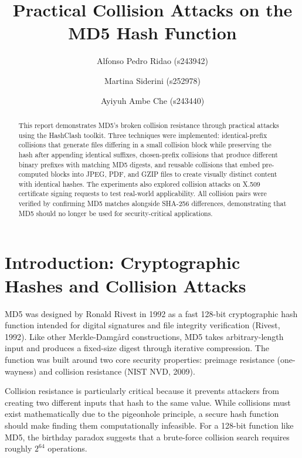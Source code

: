 \documentclass[runningheads]{llncs}
\begin{document}
    \title{Practical Collision Attacks on the MD5 Hash Function}
    \author{Alfonso Pedro Ridao (s243942) \and Martina Siderini (s252978) \and Ayiyuh Ambe Che (s243440)}

    \maketitle

    \begin{abstract}
        This report demonstrates MD5's broken collision resistance through practical attacks using the HashClash toolkit. Three techniques were implemented: identical-prefix collisions that generate files differing in a small collision block while preserving the hash after appending identical suffixes, chosen-prefix collisions that produce different binary prefixes with matching MD5 digests, and reusable collisions that embed pre-computed blocks into JPEG, PDF, and GZIP files to create visually distinct content with identical hashes. The experiments also explored collision attacks on X.509 certificate signing requests to test real-world applicability. All collision pairs were verified by confirming MD5 matches alongside SHA-256 differences, demonstrating that MD5 should no longer be used for security-critical applications.
    \end{abstract}

    \section{Introduction: Cryptographic Hashes and Collision Attacks}

    MD5 was designed by Ronald Rivest in 1992 as a fast 128-bit cryptographic hash function intended for digital signatures and file integrity verification (Rivest, 1992). Like other Merkle-Damgård constructions, MD5 takes arbitrary-length input and produces a fixed-size digest through iterative compression. The function was built around two core security properties: preimage resistance (one-wayness) and collision resistance (NIST NVD, 2009).

    Collision resistance is particularly critical because it prevents attackers from creating two different inputs that hash to the same value. While collisions must exist mathematically due to the pigeonhole principle, a secure hash function should make finding them computationally infeasible. For a 128-bit function like MD5, the birthday paradox suggests that a brute-force collision search requires roughly $2^{64}$ operations.
\end{document}
